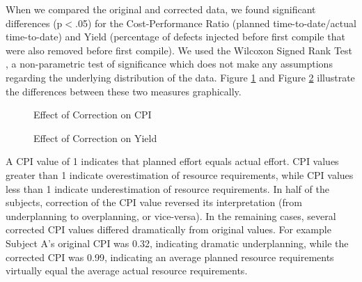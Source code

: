 
When we compared the original and corrected data, we found significant
differences (p$<$.05) for the Cost-Performance Ratio (planned
time-to-date/actual time-to-date) and Yield (percentage of defects injected
before first compile that were also removed before first compile).  We used
the Wilcoxon Signed Rank Test \cite{Ferguson89}, a non-parametric test of
significance which does not make any assumptions regarding the underlying
distribution of the data.  Figure \ref{compareCPI} and Figure
\ref{compareYield} illustrate the differences between these two measures
graphically.  


  \begin{figure} [htbp]
    {\centerline{}}
    \caption{\label{compareCPI}Effect of Correction on CPI}
  \end{figure}

  \begin{figure} [htbp]
    {\centerline{}}
    \caption{\label{compareYield}Effect of Correction on Yield}
  \end{figure}


A CPI value of 1 indicates that planned effort equals actual effort. CPI
values greater than 1 indicate overestimation of resource requirements,
while CPI values less than 1 indicate underestimation of resource
requirements.  In half of the subjects, correction of the CPI value
reversed its interpretation (from underplanning to overplanning, or
vice-versa).  In the remaining cases, several corrected CPI values differed
dramatically from original values.  For example Subject A's original CPI
was 0.32, indicating dramatic underplanning, while the corrected CPI was
0.99, indicating an average planned resource requirements virtually equal
the average actual resource requirements.

